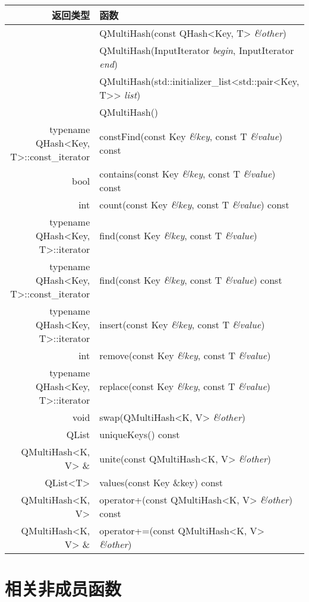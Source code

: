 \begin{longtable}{|r|m{28em}|}   
    \hline
    返回类型 	& 函数 \\
    \hline
    &QMultiHash(const QHash<Key, T> \emph{\&other}) \\
    \hline
	&QMultiHash(InputIterator \emph{begin}, InputIterator \emph{end}) \\
    \hline
	&QMultiHash(std::initializer\_list<std::pair<Key, T>> \emph{list}) \\
    \hline
	&QMultiHash()\\
\hline
typename QHash<Key, T>::const\_iterator &	constFind(const Key \emph{\&key}, const T \emph{\&value}) const \\
\hline
bool 	& contains(const Key \emph{\&key}, const T \emph{\&value}) const \\
\hline
int &	count(const Key \emph{\&key}, const T \emph{\&value}) const \\
\hline
typename QHash<Key, T>::iterator & find(const Key \emph{\&key}, const T \emph{\&value}) \\
\hline
typename QHash<Key, T>::const\_iterator &	find(const Key \emph{\&key}, const T \emph{\&value}) const \\
\hline
typename QHash<Key, T>::iterator &	insert(const Key \emph{\&key}, const T \emph{\&value}) \\
\hline
int &	remove(const Key  \emph{\&key}, const T  \emph{\&value}) \\
\hline
typename QHash<Key, T>::iterator &	replace(const Key \emph{\&key}, const T \emph{\&value}) \\
\hline
void 	& swap(QMultiHash<K, V>  \emph{\&other})\\
\hline
QList 	& uniqueKeys() const\\
\hline
QMultiHash<K, V> \& &	unite(const QMultiHash<K, V> \emph{\&other}) \\
\hline
QList<T> &	values(const Key \&key) const \\
\hline
QMultiHash<K, V> 	&operator+(const QMultiHash<K, V> \emph{\&other}) const\\
\hline
QMultiHash<K, V> \& &	operator+=(const QMultiHash<K, V> \emph{\&other})\\
    \hline
\end{longtable}

\section{相关非成员函数}

